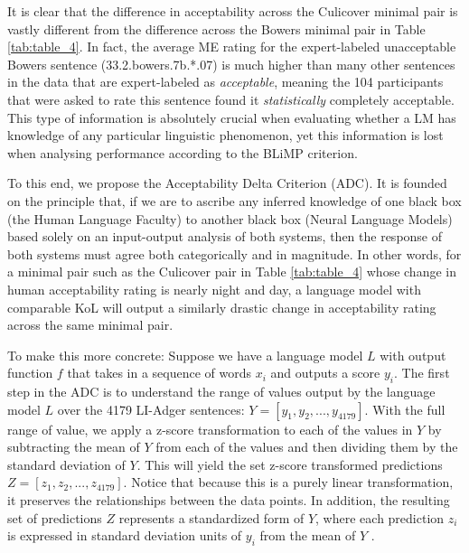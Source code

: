 It is clear that the difference in acceptability across the Culicover minimal pair is vastly different from the difference across the Bowers minimal pair in Table \ref{tab:table_4}.  In fact, the average ME rating for the expert-labeled unacceptable Bowers sentence (33.2.bowers.7b.*.07) is much higher than many other sentences in the data that are expert-labeled as \textit{acceptable}, meaning the 104 participants that were asked to rate this sentence found it \textit{statistically} completely acceptable.  This type of information is absolutely crucial when evaluating whether a LM has knowledge of any particular linguistic phenomenon, yet this information is lost when analysing performance according to the BLiMP criterion.

To this end, we propose the Acceptability Delta Criterion (ADC).  It is founded on the principle that, if we are to ascribe any inferred knowledge of one black box (the Human Language Faculty) to another black box (Neural Language Models) based solely on an input-output analysis of both systems, then the response of both systems must agree both categorically and in magnitude.  In other words, for a minimal pair such as the Culicover pair in Table \ref{tab:table_4} whose change in human acceptability rating is nearly night and day, a language model with comparable KoL will output a similarly drastic change in acceptability rating across the same minimal pair.

To make this more concrete: Suppose we have a language model $L$ with output function $f$ that takes in a sequence of words $x_i$ and outputs a score $y_i$. The first step in the ADC is to understand the range of values output by the language model $L$ over the 4179 LI-Adger sentences: $Y = [y_1, y_2, ..., y_{4179}]$.  With the full range of value, we apply a z-score transformation to each of the values in $Y$ by subtracting the mean of $Y$ from each of the values and then dividing them by the standard deviation of $Y$.  This will yield the set z-score transformed predictions $Z = [z_1, z_2, ..., z_{4179}]$.  Notice that because this is a purely linear transformation, it preserves the relationships between the data points.  In addition, the resulting set of predictions $Z$ represents a standardized form of $Y$, where each prediction $z_i$ is expressed in standard deviation units of $y_i$ from the mean of $Y$ \citep{schutze}.  

